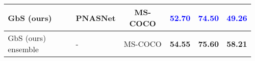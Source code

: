 \documentclass[10pt,twocolumn,letterpaper]{article}
\def\oursspace{{GbS }}
\def\ourstask{DF-WSG}
\newcommand\figvspace{\vspace{-0.2cm}}
\begin{document}
\begin{table*}[t]
\begin{center}
\begin{tabular}{ llcccc }
 \oursspace  (ours) & PNASNet &  MS-COCO & \textcolor{blue}{\textbf{52.70}} & \textcolor{blue}{\textbf{74.50}} & \textcolor{blue}{\textbf{49.26}}\\
 \midrule
 \oursspace  (ours) ensemble & - &  MS-COCO & \textbf{54.55} & \textbf{75.60} & \textbf{58.21}\\
 \bottomrule
\end{tabular}
\end{center}
\caption{Comparison with the state of the art \ourstask{} methods evaluted using the ``pointing game" accuracy on Visual Genome (VG), Flickr30K, and ReferIt. Our \ours{} method outperforms \ourstask{} SotA when using corresponding backbones (VGG or PNASNet) by up to 10.4\%. In \textcolor{red}{\textbf{red}}: best results with VGG; in \textcolor{blue}{\textbf{blue}}: best results with PNASNet; in \textbf{bold black}: result of ensembling our \ours{} models.
}
\figvspace
\label{tab:main_results}
\end{table*}
\end{document}
